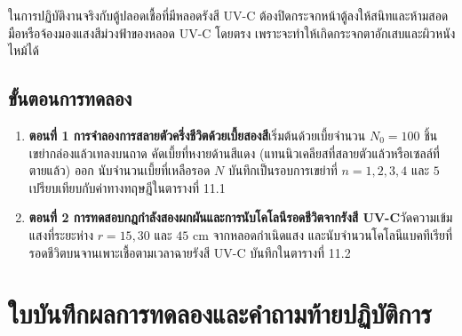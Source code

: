 \begin{warningbox}
ในการปฏิบัติงานจริงกับตู้ปลอดเชื้อที่มีหลอดรังสี UV-C ต้องปิดกระจกหน้าตู้ลงให้สนิทและห้ามสอดมือหรือจ้องมองแสงสีม่วงฟ้าของหลอด UV-C โดยตรง เพราะจะทำให้เกิดกระจกตาอักเสบและผิวหนังไหม้ได้
\end{warningbox}

\subsection{ขั้นตอนการทดลอง}
\begin{enumerate}
    \item \textbf{ตอนที่ 1 การจำลองการสลายตัวครึ่งชีวิตด้วยเบี้ยสองสี}\quad เริ่มต้นด้วยเบี้ยจำนวน $N_0 = 100$ ชิ้น เขย่ากล่องแล้วเทลงบนถาด คัดเบี้ยที่หงายด้านสีแดง (แทนนิวเคลียสที่สลายตัวแล้วหรือเซลล์ที่ตายแล้ว) ออก นับจำนวนเบี้ยที่เหลือรอด $N$ บันทึกเป็นรอบการเขย่าที่ $n = 1, 2, 3, 4$ และ $5$ เปรียบเทียบกับค่าทางทฤษฎีใน\mbox{ตารางที่} 11.1
    \item \textbf{ตอนที่ 2 การทดสอบกฎกำลังสองผกผันและการนับโคโลนีรอดชีวิตจากรังสี UV-C}\quad วัดความเข้มแสงที่ระยะห่าง $r = 15, 30$ และ $45\text{ cm}$ จากหลอดกำเนิดแสง และนับจำนวนโคโลนีแบคทีเรียที่รอดชีวิตบนจานเพาะเชื้อตามเวลาฉายรังสี UV-C บันทึกใน\mbox{ตารางที่} 11.2
\end{enumerate}

\section{ใบบันทึกผลการทดลองและคำถามท้ายปฏิบัติการ}


